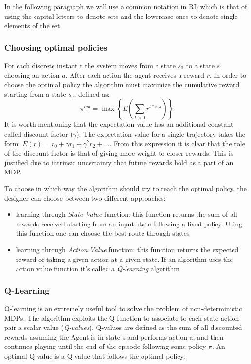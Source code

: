 In the following paragraph we will use a common notation in RL which is that of using the capital letters to denote sets and the lowercase ones to denote single elements of the set

\subsubsection{Choosing optimal policies}

For each discrete instant t the system moves from a state $s_{0}$ to a state $s_{1}$ choosing an action $a$. After each action the agent receives a reward $r$. 
In order to choose the optimal policy the algorithm must maximize the cumulative reward starting from a state $s_{0}$, defined as: 
\begin{equation}
\pi^{opt} = \max\left\{E\left(\sum_{t>0}r^{t*r|\pi}\right)\right\}
\end{equation}
It is worth mentioning that the expectation value has an additional constant called discount factor ($\gamma$).
The expectation value for a single trajectory takes the form: $E(r) = r_{0} + \gamma r_{1} + \gamma^{2} r_{2} + \ldots$.
From this expression it is clear that the role of the discount factor is that of giving more weight to closer rewards. This is justified due to intrinsic uncertainty that future rewards hold as a part of an MDP.

To choose in which way the algorithm should try to reach the optimal policy, the designer can choose between two different approaches:

\begin{itemize}
    \item learning through \emph{State Value} function: this function returns the sum of all rewards received starting from an input state following a fixed policy.
        Using this function one can choose the best route through states
    \item learning through \emph{Action Value} function: this function returns the expected reward of taking a given action at a given state.
        If an algorithm uses the action value function it's called a \emph{Q-learning} algorithm    
\end{itemize}

\subsubsection{Q-Learning}

Q-learning is an extremely useful tool to solve the problem of non-deterministic MDPs.
The algorithm exploits the Q-function to associate to each state action pair a scalar value (\emph{Q-values}).
Q-values are defined as the sum of all discounted rewards assuming the Agent is in state s and performs action a, and then continues playing until the end of the episode following some policy $\pi$.
An optimal Q-value is a Q-value that follows the optimal policy.

